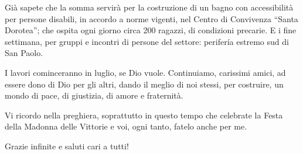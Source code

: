Già sapete che la somma servirà per la costruzione di un bagno con accessibilità per persone disabili, in accordo a norme vigenti, nel Centro di Convivenza “Santa Dorotea”; che ospita ogni giorno circa 200 ragazzi, di condizioni precarie. E i fine settimana, per gruppi e incontri di persone del settore: perifería estremo sud di San Paolo.

I lavori cominceranno in luglio, se Dio vuole. Continuiamo, carissimi amici, ad essere dono di Dio per gli altri, dando il meglio di noi stessi, per costruire, un mondo di pace, di giustizia, di amore e fraternità.

Vi ricordo nella preghiera, soprattutto in questo tempo che celebrate la Festa della Madonna delle Vittorie e voi, ogni tanto, fatelo anche per me.

Grazie infinite e saluti cari a tutti!                                                             

